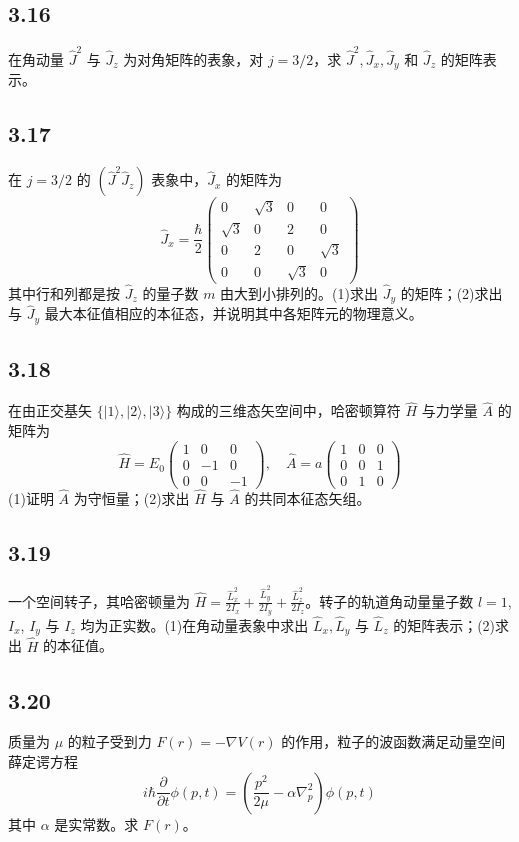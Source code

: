 \subsection{3.16}
在角动量 $\hat{J}^2$ 与 $\hat{J}_z$ 为对角矩阵的表象，对 $j = 3/2$，求 $\hat{J}^2, \hat{J}_x, \hat{J}_y$ 和 $\hat{J}_z$ 的矩阵表示。

\subsection{3.17}
在 $ j=3/2 $ 的 $(\hat{J}^2 \hat{J}_z)$ 表象中，$\hat{J}_x$ 的矩阵为
$$\hat{J}_x = \frac{\hbar}{2} \begin{pmatrix}
0 & \sqrt{3} & 0 & 0 \\
\sqrt{3} & 0 & 2 & 0 \\
0 & 2 & 0 & \sqrt{3} \\
0 & 0 & \sqrt{3} & 0
\end{pmatrix}$$
其中行和列都是按 $\hat{J}_z$ 的量子数 $m$ 由大到小排列的。(1)求出 $\hat{J}_y$ 的矩阵；(2)求出与 $\hat{J}_y$ 最大本征值相应的本征态，并说明其中各矩阵元的物理意义。

\subsection{3.18}
在由正交基矢 $\{|1\rangle, |2\rangle, |3\rangle\}$ 构成的三维态矢空间中，哈密顿算符 $\hat{H}$ 与力学量 $\hat{A}$ 的矩阵为
$$\hat{H} = E_0 
\begin{pmatrix}
1 & 0 & 0 \\
0 & -1 & 0 \\
0 & 0 & -1
\end{pmatrix}, \quad \hat{A} = a 
\begin{pmatrix}
1 & 0 & 0 \\
0 & 0 & 1 \\
0 & 1 & 0
\end{pmatrix}$$
(1)证明 $\hat{A}$ 为守恒量；(2)求出 $\hat{H}$ 与 $\hat{A}$ 的共同本征态矢组。

\subsection{3.19}
一个空间转子，其哈密顿量为 $\hat{H} = \frac{\hat{L}_x^2}{2I_x} + \frac{\hat{L}_y^2}{2I_y} + \frac{\hat{L}_z^2}{2I_z}$。转子的轨道角动量量子数 $l=1$, $I_x$, $I_y$ 与 $I_z$ 均为正实数。(1)在角动量表象中求出 $\hat{L}_x, \hat{L}_y$ 与 $\hat{L}_z$ 的矩阵表示；(2)求出 $\hat{H}$ 的本征值。

\subsection{3.20}
质量为 $\mu$ 的粒子受到力 $F(r) = -\nabla V(r)$ 的作用，粒子的波函数满足动量空间薛定谔方程
$$i\hbar \frac{\partial}{\partial t} \phi(p, t) = \left( \frac{p^2}{2\mu} - \alpha \nabla_p^2 \right) \phi(p, t)$$
其中 $\alpha$ 是实常数。求 $F(r)$。